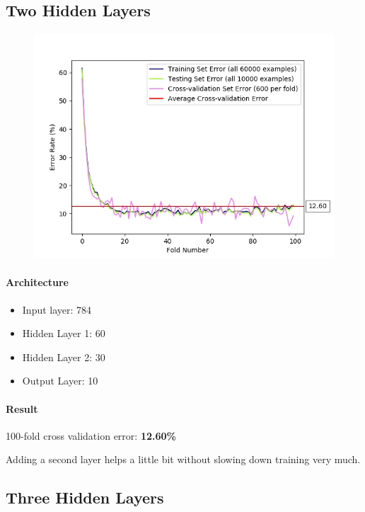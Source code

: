 \documentclass[11pt]{article}
\makeatletter
\def\maxwidth{\ifdim\Gin@nat@width>\linewidth\linewidth
    \else\Gin@nat@width\fi}
\let\Oldincludegraphics\includegraphics
\renewcommand{\includegraphics}[1]{\Oldincludegraphics[width=.8\maxwidth]{#1}}
\providecommand{\tightlist}{%
      \setlength{\itemsep}{0pt}\setlength{\parskip}{0pt}}
\makeatother
\begin{document}
\subsection{Two Hidden Layers}\label{two-hidden-layers}

\begin{figure}[htbp]
\centering
\includegraphics{plots/ff-numlayers-60-30.png}
\end{figure}

\paragraph{Architecture}\label{architecture-2}

\begin{itemize}
\tightlist
\item
  Input layer: 784
\item
  Hidden Layer 1: 60
\item
  Hidden Layer 2: 30
\item
  Output Layer: 10
\end{itemize}

\paragraph{Result}\label{result-1}

100-fold cross validation error: \textbf{12.60\%}

Adding a second layer helps a little bit without slowing down training
very much.

\pagebreak

\subsection{Three Hidden Layers}\label{three-hidden-layers}
\end{document}
